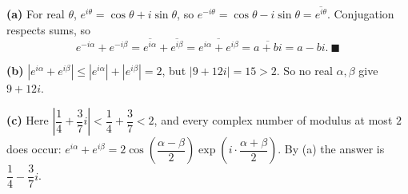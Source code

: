 \textbf{(a)} For real $\theta$, $e^{i\theta}=\cos\theta+i\sin\theta$, so $e^{-i\theta}=\cos\theta-i\sin\theta=\overline{e^{i\theta}}$. Conjugation respects sums, so
\[e^{-i\alpha}+e^{-i\beta}=\overline{e^{i\alpha}}+\overline{e^{i\beta}}=\overline{e^{i\alpha}+e^{i\beta}}=\overline{a+bi}=a-bi.\ \blacksquare\]

\textbf{(b)} $\left|e^{i\alpha}+e^{i\beta}\right|\le\left|e^{i\alpha}\right|+\left|e^{i\beta}\right|=2$, but $|9+12i|=15>2$. So no real $\alpha,\beta$ give $9+12i$.

\textbf{(c)} Here $\left|\dfrac14+\dfrac37i\right|<\dfrac14+\dfrac37<2$, and every complex number of modulus at most $2$ does occur: $e^{i\alpha}+e^{i\beta}=2\cos\left(\dfrac{\alpha-\beta}{2}\right)\exp\left(i\cdot\dfrac{\alpha+\beta}{2}\right)$. By (a) the answer is $\boxed{\dfrac14-\dfrac37i}$.
